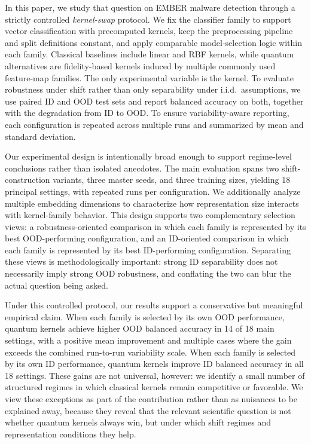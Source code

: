 \documentclass[pdflatex,sn-mathphys-num]{sn-jnl}%
\theoremstyle{thmstyleone}%
\theoremstyle{thmstyletwo}%
\theoremstyle{thmstylethree}%
\begin{document}
In this paper, we study that question on EMBER malware detection through a strictly controlled \emph{kernel-swap} protocol. We fix the classifier family to support vector classification with precomputed kernels, keep the preprocessing pipeline and split definitions constant, and apply comparable model-selection logic within each family. Classical baselines include linear and RBF kernels, while quantum alternatives are fidelity-based kernels induced by multiple commonly used feature-map families. The only experimental variable is the kernel. To evaluate robustness under shift rather than only separability under i.i.d.\ assumptions, we use paired ID and OOD test sets and report balanced accuracy on both, together with the degradation from ID to OOD. To ensure variability-aware reporting, each configuration is repeated across multiple runs and summarized by mean and standard deviation.

Our experimental design is intentionally broad enough to support regime-level conclusions rather than isolated anecdotes. The main evaluation spans two shift-construction variants, three master seeds, and three training sizes, yielding 18 principal settings, with repeated runs per configuration. We additionally analyze multiple embedding dimensions to characterize how representation size interacts with kernel-family behavior. This design supports two complementary selection views: a robustness-oriented comparison in which each family is represented by its best OOD-performing configuration, and an ID-oriented comparison in which each family is represented by its best ID-performing configuration. Separating these views is methodologically important: strong ID separability does not necessarily imply strong OOD robustness, and conflating the two can blur the actual question being asked.

Under this controlled protocol, our results support a conservative but meaningful empirical claim. When each family is selected by its own OOD performance, quantum kernels achieve higher OOD balanced accuracy in 14 of 18 main settings, with a positive mean improvement and multiple cases where the gain exceeds the combined run-to-run variability scale. When each family is selected by its own ID performance, quantum kernels improve ID balanced accuracy in all 18 settings. These gains are not universal, however: we identify a small number of structured regimes in which classical kernels remain competitive or favorable. We view these exceptions as part of the contribution rather than as nuisances to be explained away, because they reveal that the relevant scientific question is not whether quantum kernels always win, but under which shift regimes and representation conditions they help.
\end{document}
